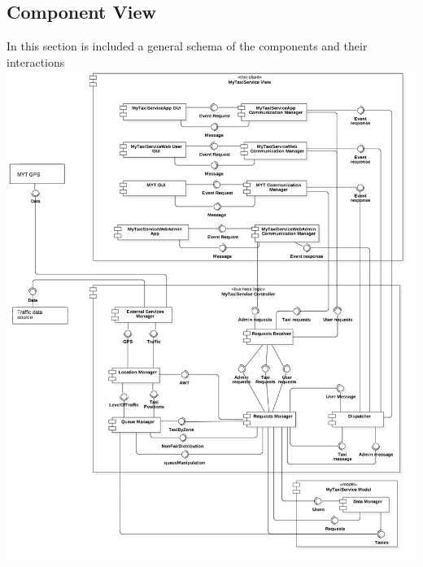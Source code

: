 \documentclass[11pt,titlepage]{article} %
\newenvironment{changemargin}[3]{%
\begin{list}{}{%
\setlength{\topsep}{0pt}%
\setlength{\headsep}{#3}%
\setlength{\leftmargin}{#1}%
\setlength{\rightmargin}{#2}%
\setlength{\listparindent}{\parindent}%
\setlength{\itemindent}{\parindent}%
\setlength{\parsep}{\parskip}%
}%
\item[]}{\end{list}}
\begin{document}
\begin{changemargin}{-2.5cm}{0cm}{0pt}
\subsection{Component View}
In this section is included a general schema of the components and their interactions\newline
	\includegraphics[scale=0.42]{component.png}
\end{changemargin}
\newpage
\end{document}
